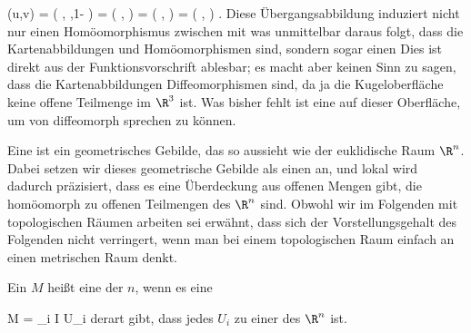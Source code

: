 {\mavergleichskettealignhandlinks
{\vergleichskettealignhandlinks
{ \psi(u,v)
}
{ =} { \beta \left(  {  }, {  } ,1- {  }  \right)
}
{ =} { \left(  {  } , {  }  \right)
}
{ =} { \left(  {  } , {  }  \right)
}
{ =} { \left(  {  } , {  }  \right)
}
}
{}
{}{.}
Diese Übergangsabbildung induziert nicht nur einen Homöomorphismus zwischen
 mit
was unmittelbar daraus folgt, dass die Kartenabbildungen
\mathkor {} {\alpha} {und} {\beta} {}
Homöomorphismen sind, sondern sogar einen
Dies ist direkt aus der Funktionsvorschrift ablesbar; es macht aber keinen Sinn zu sagen, dass die Kartenabbildungen Diffeomorphismen sind, da ja die Kugeloberfläche keine offene Teilmenge im $\R^3$ ist. Was bisher fehlt ist eine  auf dieser Oberfläche, um von diffeomorph sprechen zu können.

}

Eine  {} ist ein geometrisches Gebilde, das  so aussieht wie der euklidische Raum $\R^n$. Dabei setzen wir dieses geometrische Gebilde als einen
an, und lokal wird dadurch präzisiert, dass es eine Überdeckung aus offenen Mengen gibt, die homöomorph zu offenen Teilmengen des $\R^n$ sind. Obwohl wir im Folgenden mit topologischen Räumen arbeiten sei erwähnt, dass sich der Vorstellungsgehalt des Folgenden nicht verringert, wenn man bei einem topologischen Raum einfach an einen metrischen Raum denkt.


{}
{

Ein
$M$ heißt eine  der  $n$, wenn es eine

\mavergleichskette
{\vergleichskette
{ M
}
{ = }{  \bigcup_{i \in I} U_i
}
{  }{
}
{    }{
}
{   }{
}
}
{}{}{}
derart gibt, dass jedes $U_i$
zu einer
des $\R^n$ ist.

}

